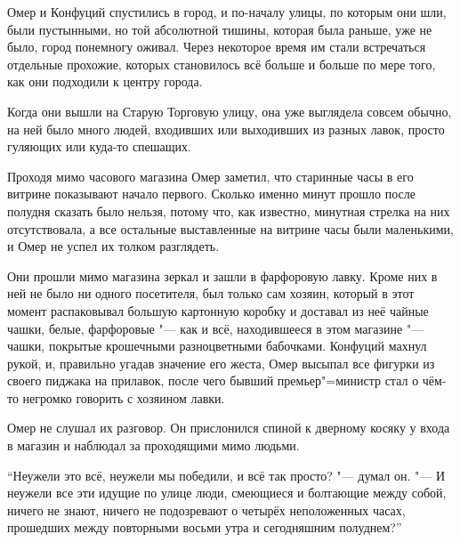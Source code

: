 Омер и Конфуций спустились в город, и по-началу улицы, по которым они шли, были
пустынными, но той абсолютной тишины, которая была раньше, уже не было, город
понемногу оживал.
Через некоторое время им стали встречаться отдельные прохожие, которых
становилось всё больше и больше по мере того, как они подходили к центру города.

Когда они вышли на Старую Торговую улицу, она уже выглядела совсем обычно, на
ней было много людей, входивших или выходивших из разных лавок, просто гуляющих
или куда-то спешащих.

Проходя мимо часового магазина Омер заметил, что старинные часы в его витрине
показывают начало первого.
Сколько именно минут прошло после полудня сказать было нельзя, потому что, как
известно, минутная стрелка на них отсутствовала, а все остальные выставленные на
витрине часы были маленькими, и Омер не успел их толком разглядеть.

Они прошли мимо магазина зеркал и зашли в фарфоровую лавку.
Кроме них в ней не было ни одного посетителя, был только сам хозяин, который в
этот момент распаковывал большую картонную коробку и доставал из неё чайные
чашки, белые, фарфоровые "--- как и всё, находившееся в этом магазине "--- чашки,
покрытые крошечными разноцветными бабочками.
Конфуций махнул рукой, и, правильно угадав значение его жеста, Омер высыпал все
фигурки из своего пиджака на прилавок, после чего бывший премьер"=министр стал о
чём-то негромко говорить с хозяином лавки.

Омер не слушал их разговор.
Он прислонился спиной к дверному косяку у входа в магазин и наблюдал за
проходящими мимо людьми.

\enquote{Неужели это всё, неужели мы победили, и всё так просто? "--- думал он.
"--- И неужели все эти идущие по улице люди, смеющиеся и болтающие между собой,
ничего не знают, ничего не подозревают о четырёх неположенных часах, прошедших
между повторными восьми утра и сегодняшним полуднем?}
